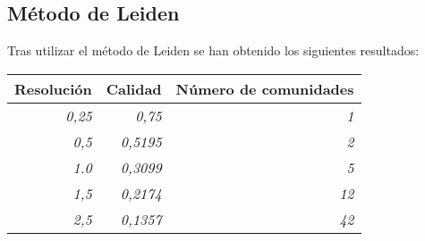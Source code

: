 \subsection{Método de Leiden}

Tras utilizar el método de Leiden se han obtenido los siguientes resultados:

\begin{table}[H]
\centering
\begin{tabular}{|r|r|r|}
\hline
\multicolumn{1}{|c|}{\textbf{Resolución}} & \multicolumn{1}{c|}{\textbf{Calidad}} & \multicolumn{1}{c|}{\textbf{Número de comunidades}} \\ \hline
\textit{0,25}                             & \textit{0,75}                         & \textit{1}                                          \\ \hline
\textit{0,5}                              & \textit{0,5195}                       & \textit{2}                                          \\ \hline
\textit{1.0}                              & \textit{0,3099}                       & \textit{5}                                          \\ \hline
\textit{1,5}                              & \textit{0,2174}                       & \textit{12}                                         \\ \hline
\textit{2,5}                              & \textit{0,1357}                       & \textit{42}                                         \\ \hline
\end{tabular}
\end{table}
